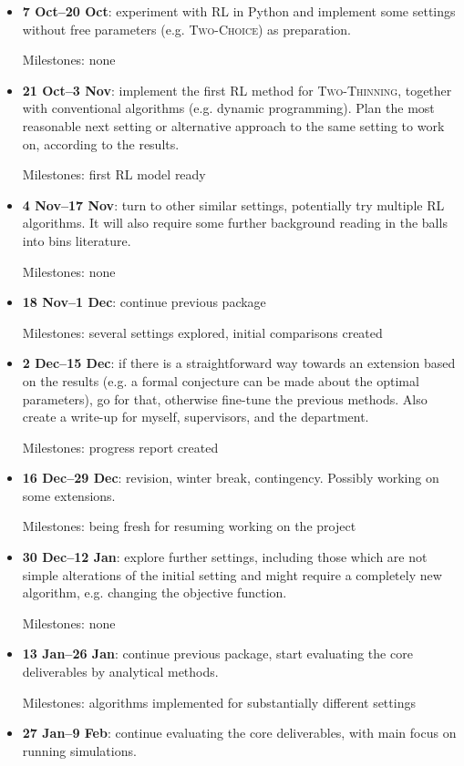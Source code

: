 \begin{itemize}
    \item 
    \textbf{7 Oct--20 Oct}: experiment with RL in Python and implement some settings without free parameters (e.g. \textsc{Two-Choice}) as preparation.
    
    Milestones: none
    \item
    \textbf{21 Oct--3 Nov}: implement the first RL method for \textsc{Two-Thinning}, together with conventional algorithms (e.g. dynamic programming). Plan the most reasonable next setting or alternative approach to the same setting to work on, according to the results.
    
    Milestones: first RL model ready
    \item
    \textbf{4 Nov--17 Nov}: turn to other similar settings, potentially try multiple RL algorithms. It will also require some further background reading in the balls into bins literature.
    
    Milestones: none
    \item
    \textbf{18 Nov--1 Dec}: continue previous package
    
    Milestones: several settings explored, initial comparisons created
    \item
    \textbf{2 Dec--15 Dec}: if there is a straightforward way towards an extension based on the results (e.g. a formal conjecture can be made about the optimal parameters), go for that, otherwise fine-tune the previous methods. Also create a write-up for myself, supervisors, and the department.
   
    Milestones: progress report created
    \item
    \textbf{16 Dec--29 Dec}: revision, winter break, contingency. Possibly working on some extensions.
    
    Milestones: being fresh for resuming working on the project
    \item
    \textbf{30 Dec--12 Jan}: explore further settings, including those which are not simple alterations of the initial setting and might require a completely new algorithm, e.g. changing the objective function.
    
    Milestones: none
    \item
    \textbf{13 Jan--26 Jan}: continue previous package, start evaluating the core deliverables by analytical methods.
    
    Milestones: algorithms implemented for substantially different settings
    \item
    \textbf{27 Jan--9 Feb}: continue evaluating the core deliverables, with main focus on running simulations.
    

\end{itemize}
